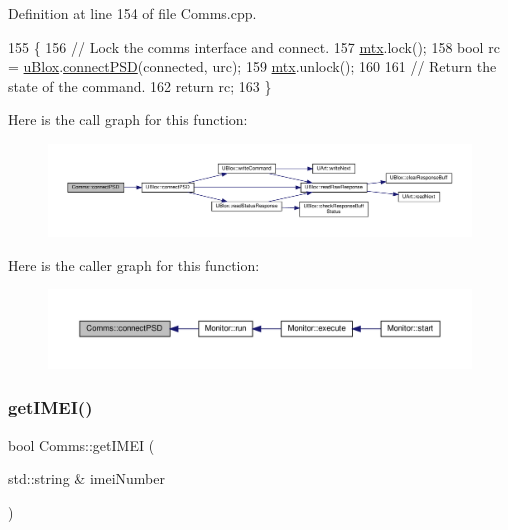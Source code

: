 Definition at line 154 of file Comms.\+cpp.


\begin{DoxyCode}
155 \{
156     \textcolor{comment}{// Lock the comms interface and connect.}
157     \hyperlink{class_comms_a21df861b1202573e4cd0cb5666d638fe}{mtx}.lock();
158     \textcolor{keywordtype}{bool} rc = \hyperlink{class_comms_ac64dea134b116147e5441172346dbd6c}{uBlox}.\hyperlink{class_u_blox_ac250bd4aea14e09b3a2595c2b8eda18a}{connectPSD}(connected, urc);
159     \hyperlink{class_comms_a21df861b1202573e4cd0cb5666d638fe}{mtx}.unlock();
160 
161     \textcolor{comment}{// Return the state of the command.}
162     \textcolor{keywordflow}{return} rc;
163 \}
\end{DoxyCode}
Here is the call graph for this function\+:
\nopagebreak
\begin{figure}[H]
\begin{center}
\leavevmode
\includegraphics[width=350pt]{d8/dcc/class_comms_a6d720b51b543ec05b140efdde4cca824_cgraph}
\end{center}
\end{figure}
Here is the caller graph for this function\+:
\nopagebreak
\begin{figure}[H]
\begin{center}
\leavevmode
\includegraphics[width=350pt]{d8/dcc/class_comms_a6d720b51b543ec05b140efdde4cca824_icgraph}
\end{center}
\end{figure}
\mbox{\label{class_comms_ab545396d2360e34fd94e7c3a996e967d}} 
\subsubsection{\texorpdfstring{get\+I\+M\+E\+I()}{getIMEI()}}
{\footnotesize\ttfamily bool Comms\+::get\+I\+M\+EI (\begin{DoxyParamCaption}\item[{std\+::string \&}]{imei\+Number }\end{DoxyParamCaption})}


